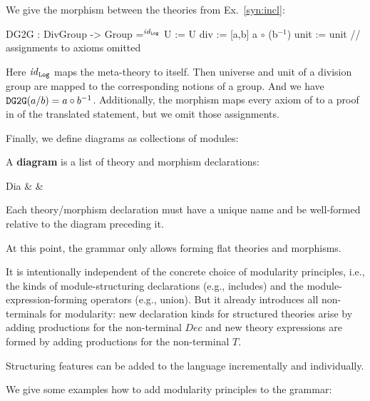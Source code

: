\begin{example}[Morphisms]\label{ex:dg2g}
We give the morphism  between the theories from Ex.~\ref{syn:incl}:
\begin{mmtcode}
DG2G : DivGroup -> Group =$^{\mathit{id}_{\operatorname{\mathtt{Log}}}}$
  U     := U
  div 	:= [a,b] a $\circ$ (b$^{-1}$) 
  unit 	:= unit
  // assignments to axioms omitted
\end{mmtcode}
Here $\mathit{id}_{\operatorname{\mathtt{Log}}}$ maps the meta-theory to itself.
Then universe and unit of a division group are mapped to the corresponding notions of a group.
And we have $\operatorname{\mathtt{DG2G}}(a/b)=a\circ b^{-1}$.
Additionally, the morphism maps every axiom of  to a proof in  of the translated statement, but we omit those assignments.
\end{example}


Finally, we define diagrams as collections of modules:

\begin{definition}[Diagram]
A \textbf{diagram} is a list of theory and morphism declarations:
\begin{grammar}
Dia    &           & \\
\end{grammar}
Each theory/morphism declaration must have a unique name and be well-formed relative to the diagram preceding it.
\end{definition}

At this point, the grammar only allows forming flat theories and morphisms.
\begin{modexp}
It is intentionally independent of the concrete choice of modularity principles, i.e., the kinds of module-structuring declarations (e.g., includes) and the module-expression-forming operators (e.g., union).
But it already introduces all non-terminals for modularity: new declaration kinds for structured theories arise by adding productions for the non-terminal $Dec$ and new theory expressions are formed by adding productions for the non-terminal $T$.
\end{modexp}
Structuring features can be added to the language incrementally and individually.
\begin{modexp}
We give some examples how to add modularity principles to the grammar:
\end{modexp}

